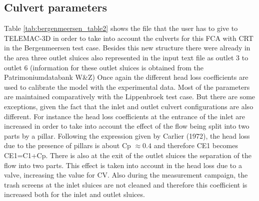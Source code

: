 \subsection{Culvert parameters}
Table \ref{tab:bergenmeersen_table2} shows the file that the user has to give to TELEMAC-3D in order to take
into account the culverts for this FCA with CRT in the Bergenmeersen test case.
Besides this new structure there were already in the area three outlet sluices
also represented in the input text file as outlet 3 to outlet 6
(information for these outlet sluices is obtained from the Patrimoniumdatabank W\&Z)
Once again the different head loss coefficients are used to calibrate the model
with the experimental data.
Most of the parameters are maintained comparatively with the Lippenbroek test case.
But there are some exceptions, given the fact that the inlet and outlet culvert configurations are also different.
For instance the head loss coefficients at the entrance of the inlet are increased in order to take
into account the effect of the flow being split into two parts by a pillar.
Following the expression given by Carlier (1972), the head loss due to the presence of pillars is about Cp $\approx 0.4$
and therefore CE1 becomes CE1=C1+Cp.
There is also at the exit of the outlet sluices the separation of the flow into two parts.
This effect is taken into account in the head loss due to a valve, increasing the value for CV.
Also during the measurement campaign, the trash screens at the inlet sluices are
not cleaned and therefore this coefficient is increased both for the inlet and outlet sluices.

